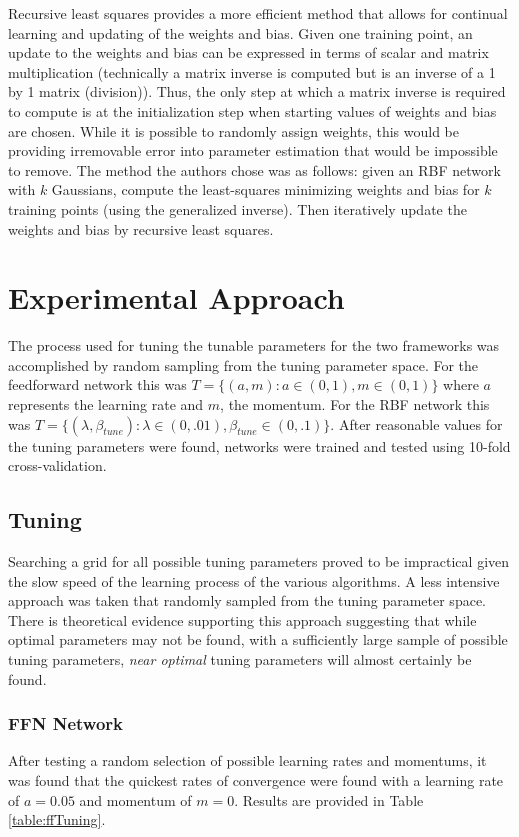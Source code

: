 \documentclass[conference]{IEEEtran}
\begin{document}
    Recursive least squares provides a more efficient method that allows for continual learning and updating of the weights and bias. Given one training point, an update to the weights and bias can be expressed in terms of scalar and matrix multiplication (technically a matrix inverse is computed but is an inverse of a 1 by 1 matrix (division)). Thus, the only step at which a matrix inverse is required to compute is at the initialization step when starting values of weights and bias are chosen. While it is possible to randomly assign weights, this would be providing irremovable error into parameter estimation that would be impossible to remove. The method the authors chose was as follows: given an RBF network with $k$ Gaussians, compute the least-squares minimizing weights and bias for $k$ training points (using the generalized inverse). Then iteratively update the weights and bias by recursive least squares.
    
\section{Experimental Approach}
  The process used for tuning the tunable parameters for the two frameworks was accomplished by random sampling from the tuning parameter space. For the feedforward network this was $T = \{(a, m) : a \in (0,1), m \in (0,1)\}$ where $a$ represents the learning rate and $m$, the momentum. For the RBF network this was $T = \{(\lambda, \beta_{tune}) : \lambda \in (0,.01), \beta_{tune} \in (0,.1)\}$. After reasonable values for the tuning parameters were found, networks were trained and tested using 10-fold cross-validation.

  \subsection{Tuning}
  Searching a grid for all possible tuning parameters proved to be impractical given the slow speed of the learning process of the various algorithms. A less intensive approach was taken that randomly sampled from the tuning parameter space. There is theoretical evidence supporting this approach \cite{bergstra} suggesting that while optimal parameters may not be found, with a sufficiently large sample of possible tuning parameters, \textit{near optimal} tuning parameters will almost certainly be found.
  \subsubsection{FFN Network}
  After testing a random selection of possible learning rates and momentums, it was found that the quickest rates of convergence were found with a learning rate of $a = 0.05$ and momentum of $m = 0$. Results are provided in Table \ref{table:ffTuning}.
\end{document}
